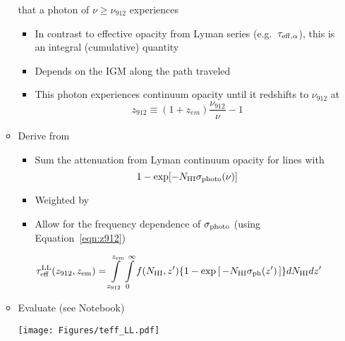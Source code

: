 \documentclass[12pt,letterpaper]{article}
\begin{document}
\begin{Aenumerate}
\begin{itemize}
\begin{itemize}
  	that a photon of $\nu \ge \nu_{912}$ experiences
  		\begin{itemize}
  		\item In contrast to effective opacity from Lyman series
  		(e.g.\ $\tau_{\rm eff,\alpha}$), 
  		this is an integral (cumulative) quantity
  		\item Depends on the IGM along the path traveled
  		\item This photon experiences continuum opacity until it
  		redshifts to $\nu_{912}$ at 
  		\begin{equation}
  		z_{912} \equiv (1+z_{em}) \frac{\nu_{912}}{\nu}  - 1
  		\label{eqn:z912}
  		\end{equation}
  		\end{itemize}
  	\item Derive from \fnhi
  		\begin{itemize}
  		\item Sum the attenuation from Lyman continuum opacity
  		for lines with \nhi
  		\begin{equation}
  		1 - \exp [-N_{\rm HI} \sigma_{\rm photo}(\nu)]
  		\end{equation}
  		\item Weighted by \fnhi
  		\item Allow for the frequency dependence of $\sigma_{\rm photo}$
  		(using Equation~\ref{eqn:z912})
  		\end{itemize}
\begin{equation}
\tau_{\rm eff}^{\rm LL}(z_{912},z_{\rm em}) = \int\limits_{z_{912}}^{z_{\rm em}} \int\limits_0^\infty f(N_{\rm HI},z')
   \lbrace 1 - \exp \left [ \, - N_{\rm HI} \sigma_{\rm ph}(z') \, \right ] \rbrace dN_{\rm HI} dz' 
\label{eqn:teff}
\end{equation}
  	\item Evaluate (see Notebook)

\texttt{[image: Figures/teff\_LL.pdf]}


\end{itemize}
\end{itemize}
\end{Aenumerate}
\end{document}
